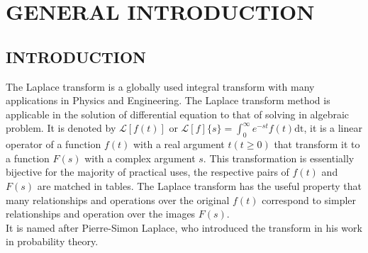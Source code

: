 \documentclass[11pt]{report}
\newcommand{\Laplace}{\mathcal{L}}
\newcommand{\ft}{f(t)}
\newcommand{\Fs}{F(s)}
\newcommand{\LaplaceIntegral}{\int_{0}^{\infty}e^{-st}\ft\text{dt}}
\newcommand{\sbracket}[1]{\left[#1\right]}
\newcommand{\LFt}{\Laplace \sbracket{\ft}}
\newcommand{\NI}{\noindent}
\newcommand{\LFn}[1]{\Laplace \sbracket{#1}}
\newcommand{\dsp}{\displaystyle}
\begin{document}
	\newpage
	\tableofcontents
	
	\newpage
	\chapter{GENERAL INTRODUCTION}
	
	\section{INTRODUCTION}
	The Laplace transform is a globally used integral transform with many applications in Physics and Engineering. The Laplace transform method is applicable in the solution of differential equation to that of solving in algebraic problem. It is denoted by $\LFt$ or $\dsp\LFn{f}\{s\} = \LaplaceIntegral$, it is a linear operator of a function $\ft$ with a real argument $t(t\geq 0)$ that transform it to a function $\Fs$ with a complex argument $s$. This transformation is essentially bijective for the majority of practical uses, the respective pairs of $\ft$ and $\Fs$ are matched in tables. The Laplace transform has the useful property that many relationships and operations over the original $\ft$ correspond to simpler relationships and operation over the images $\Fs$.\\
	
	\NI It is named after Pierre-Simon Laplace, who introduced the transform in his work in probability theory. \\
	
\end{document}
